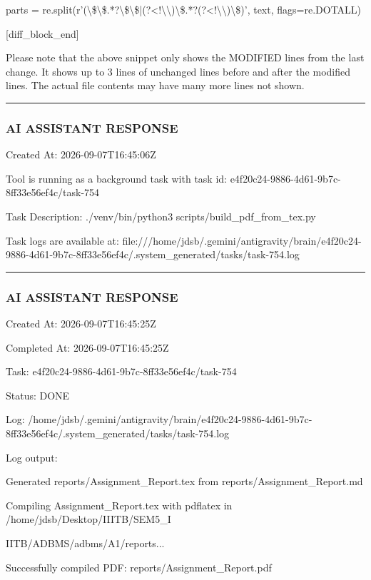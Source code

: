 \documentclass[11pt,a4paper]{article}
\begin{document}
parts = re.split(r'(\textbackslash{}\$\textbackslash{}\$.*?\textbackslash{}\$\textbackslash{}\$|(?<!\textbackslash{}\textbackslash{})\textbackslash{}\$.*?(?<!\textbackslash{}\textbackslash{})\textbackslash{}\$)', text, flags=re.DOTALL)

[diff\_block\_end]


Please note that the above snippet only shows the MODIFIED lines from the last change. It shows up to 3 lines of unchanged lines before and after the modified lines. The actual file contents may have many more lines not shown.


\hrule

\subsubsection{AI ASSISTANT RESPONSE}

Created At: 2026-09-07T16:45:06Z

Tool is running as a background task with task id: e4f20c24-9886-4d61-9b7c-8ff33e56ef4c/task-754

Task Description: ./venv/bin/python3 scripts/build\_pdf\_from\_tex.py

Task logs are available at: file:///home/jdsb/.gemini/antigravity/brain/e4f20c24-9886-4d61-9b7c-8ff33e56ef4c/.system\_generated/tasks/task-754.log


\hrule

\subsubsection{AI ASSISTANT RESPONSE}

Created At: 2026-09-07T16:45:25Z

Completed At: 2026-09-07T16:45:25Z

Task: e4f20c24-9886-4d61-9b7c-8ff33e56ef4c/task-754

Status: DONE

Log: /home/jdsb/.gemini/antigravity/brain/e4f20c24-9886-4d61-9b7c-8ff33e56ef4c/.system\_generated/tasks/task-754.log

Log output:

Generated reports/Assignment\_Report.tex from reports/Assignment\_Report.md

Compiling Assignment\_Report.tex with pdflatex in /home/jdsb/Desktop/IIITB/SEM5\_I

IITB/ADBMS/adbms/A1/reports...

Successfully compiled PDF: reports/Assignment\_Report.pdf
\end{document}
